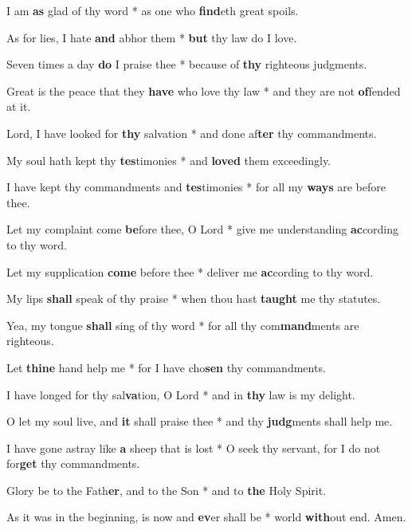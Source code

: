 \begin{multicols}{2}
	I am \textbf{as} glad of thy word * as one who \textbf{find}eth great spoils.
	
	As for lies, I hate \textbf{and} abhor them * \textbf{but} thy law do I love.
	
	Seven times a day \textbf{do} I praise thee * because of \textbf{thy} righteous judgments.
	
	Great is the peace that they \textbf{have} who love thy law * and they are not \textbf{of}fended at it.
	
	Lord, I have looked for \textbf{thy} salvation * and done af\textbf{ter} thy commandments.
	
	My soul hath kept thy \textbf{tes}timonies * and \textbf{loved} them exceedingly.
	
	I have kept thy commandments and \textbf{tes}timonies * for all my \textbf{ways} are before thee.
	
	Let my complaint come \textbf{be}fore thee, O Lord * give me understanding \textbf{ac}cording to thy word.
	
	Let my supplication \textbf{come} before thee * deliver me \textbf{ac}cording to thy word.
	
	My lips \textbf{shall} speak of thy praise * when thou hast \textbf{taught} me thy statutes.
	
	Yea, my tongue \textbf{shall} sing of thy word * for all thy com\textbf{mand}ments are righteous.
	
	Let \textbf{thine} hand help me * for I have cho\textbf{sen} thy commandments.
	
	I have longed for thy sal\textbf{va}tion, O Lord * and in \textbf{thy} law is my delight.
	
	O let my soul live, and \textbf{it} shall praise thee * and thy \textbf{judg}ments shall help me.
	
	I have gone astray like \textbf{a} sheep that is lost * O seek thy servant, for I do not for\textbf{get} thy commandments.
	
	Glory be to the Fath\textbf{er}, and to the Son * and to \textbf{the} Holy Spirit.
	
	As it was in the beginning, is now and \textbf{ev}er shall be * world \textbf{with}out end. Amen.
\end{multicols}
